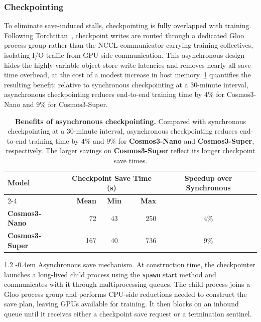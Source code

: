 \documentclass{llmxive}
\makeatletter
\providecommand{\paragraph}{  \@startsection{paragraph}{4}{\z@}    {1\baselineskip \@plus .2\baselineskip}    {-0.4em}    {\normalfont\normalsize\bfseries}}
\makeatother
\begin{document}
\subsubsection{Checkpointing}

To eliminate save-induced stalls, checkpointing is fully overlapped with training. Following Torchtitan~\citep{torchtitan}, checkpoint writes are routed through a dedicated Gloo process group rather than the NCCL communicator carrying training collectives, isolating I/O traffic from GPU-side communication. This asynchronous design hides the highly variable object-store write latencies and removes nearly all save-time overhead, at the cost of a modest increase in host memory. \cref{tab:cosmos3_checkpointing} quantifies the resulting benefit: relative to synchronous checkpointing at a 30-minute interval, asynchronous checkpointing reduces end-to-end training time by $4\%$ for Cosmos3-Nano and $9\%$ for Cosmos3-Super.

\begin{table}[t]
    \centering
    \setlength{\tabcolsep}{6pt}
    \small
    \begin{tabular}{l|rcr|c}
        \toprule
        \multirow{2}{*}{\textbf{Model}}
            & \multicolumn{3}{c|}{\textbf{Checkpoint Save Time (s)}}
            & \multirow{2}{*}{\textbf{Speedup over Synchronous}} \\
        \cmidrule(lr){2-4}
            & \textbf{Mean} & \textbf{Min} & \textbf{Max} & \\
        \midrule
        \textbf{Cosmos3-Nano}  &  72 & 43 & 250 & $4\%$ \\
        \textbf{Cosmos3-Super} & 167 & 40 & 736 & $9\%$ \\
        \bottomrule
    \end{tabular}
\caption{\textbf{Benefits of asynchronous checkpointing.} Compared with synchronous checkpointing at a 30-minute interval, asynchronous checkpointing reduces end-to-end training time by $4\%$ and $9\%$ for \textbf{Cosmos3-Nano} and \textbf{Cosmos3-Super}, respectively. The larger savings on \textbf{Cosmos3-Super} reflect its longer checkpoint save times.}
\label{tab:cosmos3_checkpointing}
\end{table}

\paragraph{Asynchronous save mechanism.} At construction time, the checkpointer launches a long-lived child process using the \texttt{spawn} start method and communicates with it through multiprocessing queues. The child process joins a Gloo process group and performs CPU-side reductions needed to construct the save plan, leaving GPUs available for training. It then blocks on an inbound queue until it receives either a checkpoint save request or a termination sentinel.
\end{document}
